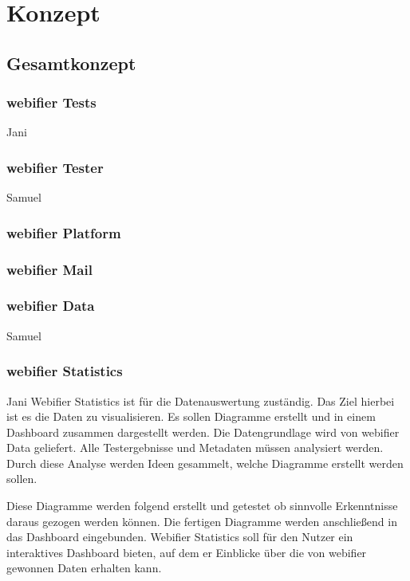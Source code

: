\chapter{Konzept}

\section{Gesamtkonzept}

\subsection{webifier Tests}

\todo Jani

\subsection{webifier Tester}

\todo Samuel

\subsection{webifier Platform}


\subsection{webifier Mail}


\subsection{webifier Data}

\todo Samuel

\subsection{webifier Statistics}

\todo Jani
Webifier Statistics ist für die Datenauswertung zuständig. Das Ziel hierbei ist es die Daten zu visualisieren. Es sollen Diagramme erstellt und in einem Dashboard zusammen dargestellt werden. Die Datengrundlage wird von webifier Data geliefert. Alle Testergebnisse und Metadaten müssen analysiert werden. Durch diese Analyse werden Ideen gesammelt, welche Diagramme erstellt werden sollen.

Diese Diagramme werden folgend erstellt und getestet ob sinnvolle Erkenntnisse daraus gezogen werden können. Die fertigen Diagramme werden anschließend in das Dashboard eingebunden. Webifier Statistics soll für den Nutzer ein interaktives Dashboard bieten, auf dem er Einblicke über die von webifier gewonnen Daten erhalten kann. 

